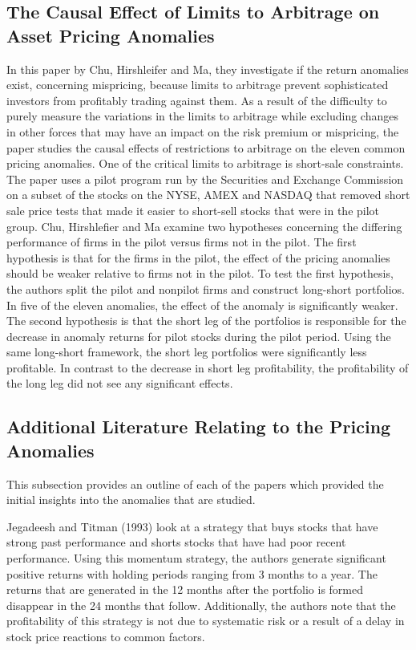\documentclass[a4paper,12pt]{article}                 %
\begin{document}
\subsection{The Causal Effect of Limits to Arbitrage on Asset Pricing Anomalies}
In this paper by Chu, Hirshleifer and Ma, they investigate if the return anomalies exist, concerning mispricing, because limits to arbitrage prevent sophisticated investors from profitably trading against them. As a result of the difficulty to purely measure the variations in the limits to arbitrage while excluding changes in other forces that may have an impact on the risk premium or mispricing, the paper studies the causal effects of restrictions to arbitrage on the eleven common pricing anomalies. One of the critical limits to arbitrage is short-sale constraints. The paper uses a pilot program run by the Securities and Exchange Commission on a subset of the stocks on the NYSE, AMEX and NASDAQ that removed short sale price tests that made it easier to short-sell stocks that were in the pilot group. 
Chu, Hirshlefier and Ma examine two hypotheses concerning the differing performance of firms in the pilot versus firms not in the pilot. The first hypothesis is that for the firms in the pilot, the effect of the pricing anomalies should be weaker relative to firms not in the pilot. To test the first hypothesis, the authors split the pilot and nonpilot firms and construct long-short portfolios. In five of the eleven anomalies, the effect of the anomaly is significantly weaker.
The second hypothesis is that the short leg of the portfolios is responsible for the decrease in anomaly returns for pilot stocks during the pilot period. Using the same long-short framework, the short leg portfolios were significantly less profitable. In contrast to the decrease in short leg profitability, the profitability of the long leg did not see any significant effects.

\subsection{Additional Literature Relating to the Pricing Anomalies}
This subsection provides an outline of each of the papers which provided the initial insights into the anomalies that are studied.

Jegadeesh and Titman (1993) look at a strategy that buys stocks that have strong past performance and shorts stocks that have had poor recent performance. Using this momentum strategy, the authors generate significant positive returns with holding periods ranging from 3 months to a year. The returns that are generated in the 12 months after the portfolio is formed disappear in the 24 months that follow. Additionally, the authors note that the profitability of this strategy is not due to systematic risk or a result of a delay in stock price reactions to common factors. 
\end{document}
